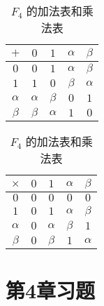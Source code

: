 \documentclass[color=black,device=normal,lang=cn,mode=geye]{elegantnote}
\begin{document}
\begin{table}\caption{$F_4$ 的加法表和乘法表}\label{tb1}
    \begin{center}
        \begin{tabular}{c|cccc}
            $+$      & $0$      & $1$      & $\alpha$ & $\beta$   \\
            \hline
            $0$      & $0$      & $1$      & $\alpha$ & $\beta$   \\
            $1$      & $1$      & $0$      & $\beta$  & $\alpha$  \\
            $\alpha$ & $\alpha$ & $\beta$  & $0$      & $1$       \\
            $\beta$  & $\beta$  & $\alpha$ & $1$      & $0$       \\
        \end{tabular}\quad\quad
        \begin{tabular}{c|cccc}
            $\times$ & $0$ & $1$      & $\alpha$ & $\beta$  \\
            \hline
            $0$      & $0$ & $0$      & $0$      & $0$      \\
            $1$      & $0$ & $1$      & $\alpha$ & $\beta$  \\
            $\alpha$ & $0$ & $\alpha$ & $\beta$  & $1$      \\
            $\beta$  & $0$ & $\beta$  & $1$      & $\alpha$ \\
        \end{tabular}
    \end{center}
\end{table}
\section{第4章习题}
\end{document}
